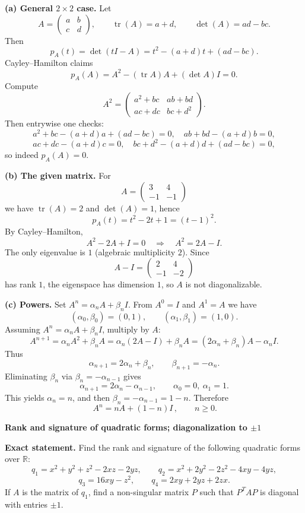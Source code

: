 \begin{solution}
\textbf{(a) General $2\times 2$ case.}
Let
\[
A=\begin{pmatrix}a&b\\c&d\end{pmatrix},\qquad \operatorname{tr}(A)=a+d,\qquad \det(A)=ad-bc.
\]
Then
\[
p_A(t)=\det(tI-A)=t^2-(a+d)t+(ad-bc).
\]
Cayley--Hamilton claims
\[
p_A(A)=A^2-(\operatorname{tr} A)A+(\det A)I=0.
\]
Compute
\[
A^2=\begin{pmatrix}a^2+bc&ab+bd\\ac+dc&bc+d^2\end{pmatrix}.
\]
Then entrywise one checks:
\[
a^2+bc-(a+d)a+(ad-bc)=0,\quad ab+bd-(a+d)b=0,
\]
\[
ac+dc-(a+d)c=0,\quad bc+d^2-(a+d)d+(ad-bc)=0,
\]
so indeed $p_A(A)=0$.

\textbf{(b) The given matrix.}
For
\[
A=\begin{pmatrix}3&4\\-1&-1\end{pmatrix}
\]
we have $\operatorname{tr}(A)=2$ and $\det(A)=1$, hence
\[
p_A(t)=t^2-2t+1=(t-1)^2.
\]
By Cayley--Hamilton,
\[
A^2-2A+I=0 \quad\Longrightarrow\quad A^2=2A-I.
\]
The only eigenvalue is $1$ (algebraic multiplicity $2$). Since
\[
A-I=\begin{pmatrix}2&4\\-1&-2\end{pmatrix}
\]
has rank $1$, the eigenspace has dimension $1$, so $A$ is not diagonalizable.

\textbf{(c) Powers.}
Set $A^n=\alpha_n A+\beta_n I$. From $A^0=I$ and $A^1=A$ we have
\[
(\alpha_0,\beta_0)=(0,1),\qquad (\alpha_1,\beta_1)=(1,0).
\]
Assuming $A^n=\alpha_n A+\beta_n I$, multiply by $A$:
\[
A^{n+1}=\alpha_n A^2+\beta_n A=\alpha_n(2A-I)+\beta_n A=(2\alpha_n+\beta_n)A-\alpha_n I.
\]
Thus
\[
\alpha_{n+1}=2\alpha_n+\beta_n,\qquad \beta_{n+1}=-\alpha_n.
\]
Eliminating $\beta_n$ via $\beta_n=-\alpha_{n-1}$ gives
\[
\alpha_{n+1}=2\alpha_n-\alpha_{n-1},\qquad \alpha_0=0,\ \alpha_1=1.
\]
This yields $\alpha_n=n$, and then $\beta_n=-\alpha_{n-1}=1-n$. Therefore
\[
\boxed{\,A^n=nA+(1-n)I\,,\qquad n\ge 0.}
\]
\end{solution}

\begin{problem}[CP-I-0112]
\label{prob:cp-i-0112}
\textbf{Rank and signature of quadratic forms; diagonalization to $\pm 1$}

\textbf{Exact statement.}
\hspace*{1.5em}Find the rank and signature of the following quadratic forms over $\mathbb R$:
\[
q_1=x^2+y^2+z^2-2xz-2yz,\qquad
q_2=x^2+2y^2-2z^2-4xy-4yz,
\]
\[
q_3=16xy-z^2,\qquad
q_4=2xy+2yz+2zx.
\]
If $A$ is the matrix of $q_1$, find a non-singular matrix $P$ such that $P^TAP$ is diagonal with entries $\pm 1$.
\end{problem}

